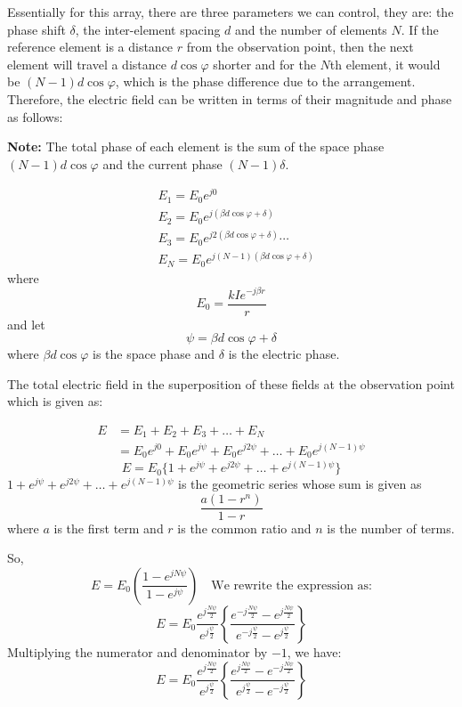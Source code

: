Essentially for this array, there are three parameters we can control, they are: the phase shift $\delta$, the inter-element spacing $d$ and the number of elements $N$. If the reference element is a distance $r$ from the observation point,  then the next element will travel a distance $d\cos\varphi$ shorter and for the $N$th element, it would be $(N-1) d\cos\varphi $, which is the phase difference due to the arrangement. Therefore, the electric field can be written in terms of their magnitude and phase as follows:

\textbf{Note:} The total phase of each element is the sum of the space phase $(N-1) d\cos\varphi$ and the current phase $(N-1) \delta$.

\begin{align*}
&E_1 = E_0 e^{j0}\\
&E_2 = E_0 e^{j(\beta d\cos\varphi + \delta)} \\
&E_3 = E_0 e^{j2(\beta d\cos\varphi + \delta)} \cdots \\
&E_N = E_0 e^{j(N-1)(\beta d\cos\varphi + \delta)}
\end{align*}
where $$E_0 = \frac{kIe^{-j\beta r}}{r}$$ and let $$\psi = \beta d\cos\varphi + \delta$$ where $\beta d\cos\varphi$ is the space phase and $\delta$ is the electric phase.

The total electric field in the superposition of these fields at the observation point which is given as:

\begin{align*}
E &= E_1 + E_2 + E_3 + \dots + E_N \\
&= E_0e^{j0} + E_0e^{j\psi} + E_0e^{j2\psi} + \dots + E_0e^{j(N-1)\psi}
\end{align*}
\begin{equation}
\label{34}
E = E_0 \{1 + e^{j\psi} + e^{j2\psi} + \dots + e^{j(N-1)\psi} \}
\end{equation}
$1 + e^{j\psi} + e^{j2\psi} + \dots + e^{j(N-1)\psi}$ is the geometric series whose sum is given  as $$\frac{a(1-r^n)}{1-r}$$ where $a$ is the first term and $r$ is the common ratio and $n$ is the number of terms.

So,
$$
E = E_0 \left(\frac{1-e^{jN\psi}}{1-e^{j\psi}}\right) \quad \text{We rewrite the expression as:}
$$
$$
E = E_0 \frac{e^{j\frac{N\psi}{2}}}{e^{j\frac{\psi}{2}}} \left\{\frac{e^{-j\frac{N\psi}{2}} - e^{j\frac{N\psi}{2}}}{e^{-j\frac{\psi}{2}} - e^{j\frac{\psi}{2}}}\right\}
$$
Multiplying the numerator and denominator by $-1$, we have:
$$
E = E_0 \frac{e^{j\frac{N\psi}{2}}}{e^{j\frac{\psi}{2}}} \left\{\frac{e^{j\frac{N\psi}{2}} - e^{-j\frac{N\psi}{2}}}{e^{j\frac{\psi}{2}} - e^{-j\frac{\psi}{2}}}\right\}
$$

